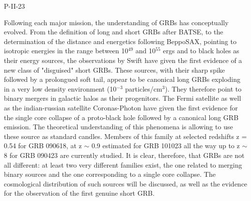 P-II-23


\bigskip



\bigskip

\noindent Following each major mission, the understanding of GRBs has conceptually evolved. From the definition of long and short GRBs after BATSE, to the determination of the distance and energetics following BeppoSAX, pointing to isotropic energies in the range between 10$^{49}$ and 10$^{55}$ ergs and to black holes as their energy sources, the observations by Swift have given the first evidence of a new class of "disguised" short GRBs. These sources, with their sharp spike followed by a prolongued soft tail, appear to be canonical long GRBs exploding in a very low density environment (10$^{-3}$ particles/cm$^3$). They therefore point to binary mergers in galactic halos as their progenitors. The Fermi satellite as well as the indian-russian satellite Coronas-Photon have given the first evidence for the single core collapse of a proto-black hole followed by a canonical long GRB emission. The theoretical understanding of this phenomena is allowing to use these source as standard candles. Members of this family at selected redshifts z = 0.54 for GRB 090618, at z $\sim$ 0.9 estimated for GRB 101023 all the way up to z $\sim$ 8 for GRB 090423 are currently studied. It is clear, therefore, that GRBs are not all different: at least two very different families exist, the one related to merging binary sources and the one corresponding to a single core collapse. The cosmological distribution of such sources will be discussed, as well as the evidence for the observation of the first genuine short GRB.

